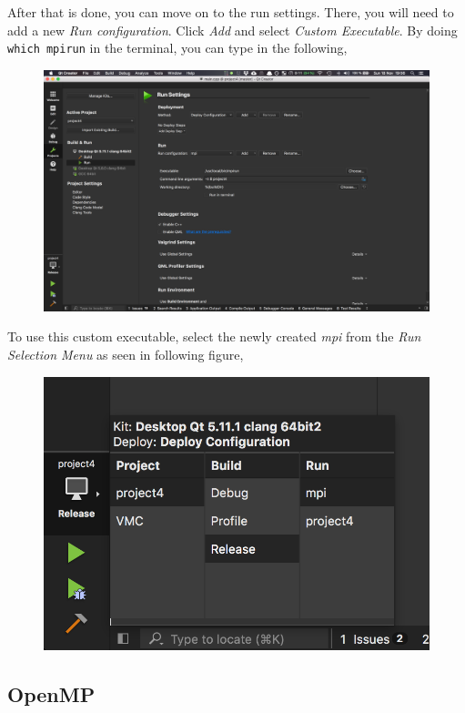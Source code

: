 \documentclass[11pt]{article}
\begin{document}
After that is done, you can move on to the run settings. There, you will need to add a new \textit{Run configuration}. Click \textit{Add} and select \textit{Custom Executable}. By doing \texttt{which mpirun} in the terminal, you can type in the following,
\begin{figure}[H]
    \centering
    \includegraphics[width=\textwidth]{figures/mpi/mpi_run_settings.png}
\end{figure}

To use this custom executable, select the newly created \textit{mpi} from the \textit{Run Selection Menu} as seen in following figure,
\begin{figure}[H]
    \centering
    \includegraphics[width=\textwidth]{figures/mpi/qt_run_selection.png}
\end{figure}



\subsection{OpenMP}
\end{document}
